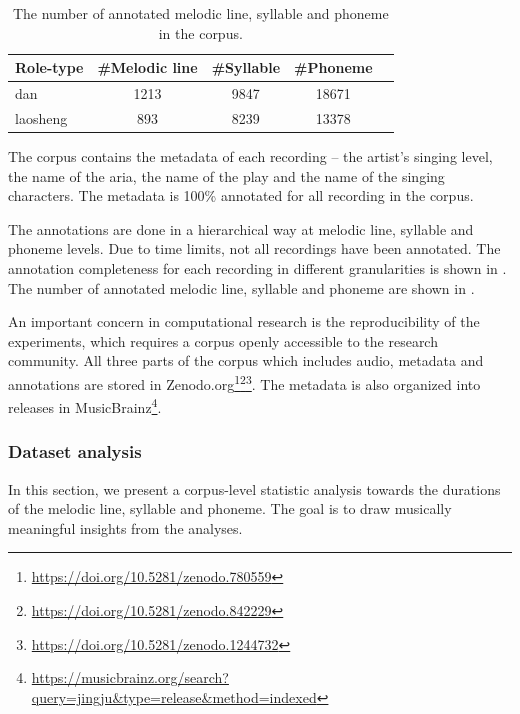 \begin{table}[ht]
    \centering
    \begin{tabular}{l|cccc}
        \toprule
        Role-type & \#Melodic line & \#Syllable & \#Phoneme \\
        \midrule
        dan           & 1213 	& 9847 	& 18671  	\\
        laosheng      & 893 	& 8239 	& 13378 	\\
        \bottomrule
    \end{tabular}
    \caption{The number of annotated melodic line, syllable and phoneme in the corpus.}
    \label{table:ch4:annotated_number}
\end{table}

The corpus contains the metadata of each recording -- the artist's singing level, the name of the aria, the name of the play and the name of the singing characters. The metadata is 100\% annotated for all recording in the corpus.

The annotations are done in a hierarchical way at melodic line, syllable and phoneme levels. Due to time limits, not all recordings have been annotated. The annotation completeness for each recording in different granularities is shown in . The number of annotated melodic line, syllable and phoneme are shown in .

An important concern in computational research is the reproducibility of the experiments, which requires a corpus openly accessible to the research community. All three parts of the corpus which includes audio, metadata and annotations are stored in Zenodo.org\footnote{\url{https://doi.org/10.5281/zenodo.780559}}\footnote{\url{https://doi.org/10.5281/zenodo.842229}}\footnote{\url{https://doi.org/10.5281/zenodo.1244732}}. The metadata is also organized into releases in MusicBrainz\footnote{\url{https://musicbrainz.org/search?query=jingju\&type=release\&method=indexed}}.

\subsubsection{Dataset analysis}\label{sec:ch4:dataset_analysis}

In this section, we present a corpus-level statistic analysis towards the durations of the melodic line, syllable and phoneme. The goal is to draw musically meaningful insights from the analyses. 


